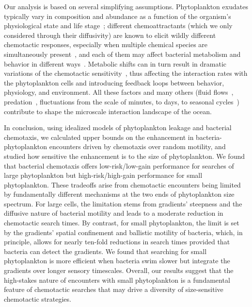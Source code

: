 \documentclass[9pt,twocolumn,twoside]{pnas-new}
\begin{document}
Our analysis is based on several simplifying assumptions. Phytoplankton exudates typically vary in composition and abundance as a function of the organism's physiological state and life stage~\cite{maranon2004significance,thornton2014dissolved,seymour2017zooming}; different chemoattractants (which we only considered through their diffusivity) are known to elicit wildly different chemotactic responses, especially when multiple chemical species are simultaneously present~\cite{clerc2023strong,li2024phenotypic}, and each of them may affect bacterial metabolism and behavior in different ways~\cite{barak-gavish2023bacterial,stubbusch2023polysaccharide}. Metabolic shifts can in turn result in dramatic variations of the chemotactic sensitivity~\cite{egbert2010minimal,ni2020growthrate}, thus affecting the interaction rates with the phytoplankton cells and introducing feedback loops between behavior, physiology, and environment. All these factors and many others (fluid flows~\cite{bowen1993simulating,blackburn1999influence,kiorboe2001marine,taylor2012tradeoffs,slomka2020encounter}, predation~\cite{nielsen2021foraging}, fluctuations from the scale of minutes, to days, to seasonal cycles~\cite{bernhardt2020life,karin2021temporal,nguyen2021environmental}) contribute to shape the microscale interaction landscape of the ocean.


In conclusion, using idealized models of phytoplankton leakage and bacterial chemotaxis, we calculated upper bounds on the enhancement in bacteria-phytoplankton encounters driven by chemotaxis over random motility, and studied how sensitive the enhancement is to the size of phytoplankton. We found that bacterial chemotaxis offers low-risk/low-gain performance for searches of large phytoplankton but high-risk/high-gain performance for small phytoplankton. These tradeoffs arise from chemotactic encounters being limited by fundamentally different mechanisms at the two ends of phytoplankton size spectrum. For large cells, the limitation stems from gradients' steepness and the diffusive nature of bacterial motility and leads to a moderate reduction in chemotactic search times. By contrast, for small phytoplankton, the limit is set by the gradients' spatial confinement and ballistic motility of bacteria, which, in principle, allows for nearly ten-fold reductions in search times provided that bacteria can detect the gradients. We found that searching for small phytoplankton is more efficient when bacteria swim slower but integrate the gradients over longer sensory timescales. Overall, our results suggest that the high-stakes nature of encounters with small phytoplankton is a fundamental feature of chemotactic searches that may drive a diversity of size-sensitive chemotactic strategies.
\end{document}
